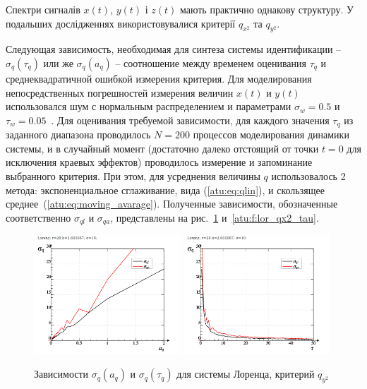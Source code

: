 Спектри сигналів $x(t)$, $y(t)$ і $z(t)$ мають практично однакову
структуру. У подальших дослідженнях використовувалися критерії
$q_{x^2}$ та
$q_{y^2}$.

Следующая зависимость, необходимая для синтеза
системы идентификации -- $ \sigma_q(\tau_q) $
или же  $ \sigma_q(a_q) $ -- соотношение между
временем оценивания $\tau_q$ и среднеквадратичной
ошибкой измерения критерия.
Для моделирования непосредственных погрешностей измерения величин
$x(t)$ и $y(t)$ использовался шум с нормальным распределением
и параметрами $\sigma_w=0.5$ и $\tau_w=0.05$~\cite{atu_asau26}.
Для оценивания требуемой зависимости, для каждого
значения $\tau_q$ из заданного диапазона
проводилось $N=200$ процессов моделирования динамики системы,
и в случайный момент (достаточно далеко отстоящий от точки $t=0$ для исключения краевых эффектов)
проводилось измерение и запоминание выбранного критерия.
При этом, для усреднения величины $q$ использовалось 2 метода:
экспоненциальное сглаживание, вида (\ref{atu:eq:qlin}), и скользящее среднее~(\ref{atu:eq:moving_avarage}).
Полученные зависимости, обозначенные соответственно
$\sigma_{ql}$ и $\sigma_{qa}$, представлены на
рис.~\ref{atu:f:lor_qy2_tau} и~\ref{atu:f:lor_qx2_tau}.


\begin{figure}[ht!]
\begin{center}
  \includegraphics[width=0.49\textwidth]{p/cha/lor/lor_q_tau-p_aq_sd.png}
  \hfill
  \includegraphics[width=0.49\textwidth]{p/cha/lor/lor_q_tau-p_tau_sd.png}
\end{center}
  \caption{Зависимости $\sigma_{q}(a_q)$ и $\sigma_{q}(\tau_q)$ для системы Лоренца, критерий  $q_{y^2}$}
\label{atu:f:lor_qy2_tau}
\end{figure}


